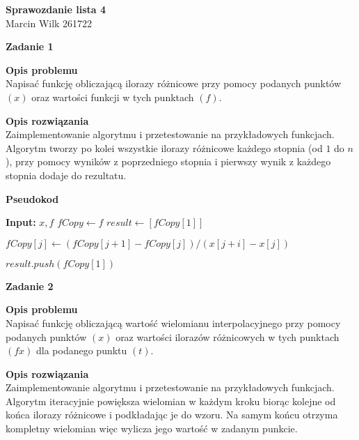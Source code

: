 \documentclass{article}
\begin{document}
\begin{center}
	\textbf{\LARGE Sprawozdanie lista 4} \\
	{\large Marcin Wilk 261722} \\

\end{center}

\noindent \textbf{\large Zadanie 1}

\noindent \textbf{Opis problemu} \\
Napisać funkcję obliczającą ilorazy różnicowe przy pomocy podanych
punktów $(x)$ oraz wartości funkcji w tych punktach $(f)$.

\noindent \textbf{Opis rozwiązania} \\
Zaimplementowanie algorytmu i przetestowanie na przykładowych funkcjach.
Algorytm tworzy po kolei wszystkie ilorazy różnicowe każdego stopnia
(od $1$ do $n$), przy pomocy wyników z poprzedniego stopnia i pierwszy wynik
z każdego stopnia dodaje do rezultatu.

\noindent \textbf{Pseudokod}

\begin{algorithmic}
	\State \textbf{Input:} $x, f$
	\State $fCopy \gets f$
	\State $result \gets [fCopy[1]]$



	\State $fCopy[j] \gets (fCopy[j+1] - fCopy[j]) / (x[j+i] - x[j])$

	$result.push(fCopy[1])$

	\EndFor

	\State {}

	\EndFor
\end{algorithmic}

\noindent \textbf{\large Zadanie 2}

\noindent \textbf{Opis problemu} \\
Napisać funkcję obliczającą wartość wielomianu interpolacyjnego przy pomocy
podanych punktów $(x)$ oraz wartości ilorazów różnicowych w tych punktach $(fx)$
dla podanego punktu $(t)$.

\noindent \textbf{Opis rozwiązania} \\
Zaimplementowanie algorytmu i przetestowanie na przykładowych funkcjach.
Algorytm iteracyjnie powiększa wielomian w każdym kroku biorąc kolejne od
końca ilorazy różnicowe i podkładając je do wzoru. Na samym końcu otrzyma kompletny
wielomian więc wylicza jego wartość w zadanym punkcie.
\end{document}
